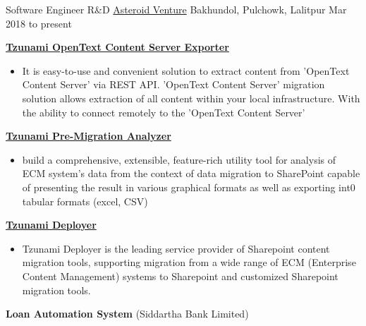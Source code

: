 

\begin{cventries}
\cventry
{Software Engineer R\&D} %
{\href{https://asteroidventure.com/}{Asteroid Venture}} %
{Bakhundol, Pulchowk, Lalitpur} %
{Mar 2018 to present} %
{
\begin{cvitems} %
		\item {\textbf{\href{https://tzunami.com/opentext-content-server/}{Tzunami OpenText Content Server Exporter}}}
		\begin{itemize}
			\item {It is easy-to-use and convenient solution to extract content from 'OpenText Content Server' via REST API. 'OpenText Content Server' migration solution allows extraction of all content within your local infrastructure. With the ability to connect remotely to the 'OpenText Content Server'}
		\end{itemize}
		\item {\textbf{\href{https://tzunami.com/pre-migration-analysis/}{Tzunami Pre-Migration Analyzer}}}
		\begin{itemize}
			\item {build a comprehensive, extensible, feature-rich utility tool for analysis of ECM system's data from the context of data migration to SharePoint capable of presenting the result in various graphical formats as well as exporting int0 tabular formats (excel, CSV)}
		\end{itemize}
		\item {\textbf{\href{https://tzunami.com/}{Tzunami Deployer}}}
		\begin{itemize}
			\item {Tzunami Deployer is the leading service provider of Sharepoint content migration tools, supporting migration from a wide range of ECM (Enterprise Content Management) systems to Sharepoint and customized Sharepoint migration tools.}
		\end{itemize}
		\item {\textbf{Loan Automation System} (Siddartha Bank Limited)}

\end{cvitems}}
\end{cventries}
